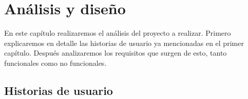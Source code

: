 \documentclass[12pt]{report} %
\begin{document}


\chapter{Análisis y diseño}

En este capítulo realizaremos el análisis del proyecto a realizar. Primero explicaremos en detalle las historias de usuario ya mencionadas en el primer capítulo. Después analizaremos los requisitos que surgen de esto, tanto funcionales como no funcionales.

\section{Historias de usuario}
\end{document}
